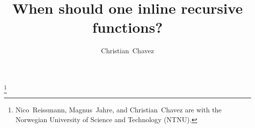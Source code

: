 \documentclass[a4paper]{article}
\begin{document}
\title{When should one inline recursive functions?}
\author{Christian~Chavez}
\maketitle

\thanks{Nico~Reissmann, Magnus~Jahre, and Christian~Chavez are with the
Norwegian University of Science and Technology (NTNU).}



\vfill

\clearpage
\tableofcontents
\clearpage












\clearpage
\appendix
\addappheadtotoc

\end{document}
